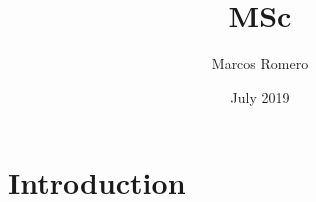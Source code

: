 \documentclass{article}
\title{MSc}
\author{Marcos Romero}
\date{July 2019}
\begin{document}
\maketitle

\section{Introduction}
\end{document}
